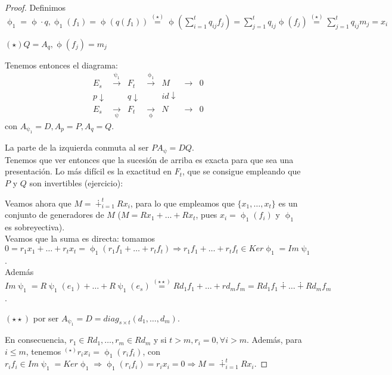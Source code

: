 \documentclass[11pt,a4paper]{article}
\theoremstyle{break}
\begin{document}
\begin{proof}
Definimos $\upphi_{1} = \upphi \cdot q, \upphi_{1}(f_{1}) = \upphi(q(f_{1})) \overset{(\star)}{=} \upphi(\sum_{i=1}^{t} q_{ij}f_{j}) = \sum_{j=1}^{t} q_{ij} \upphi(f_{j}) \overset{(\star)}{=} \sum_{j=1}^{t} q_{ij}m_{j} = x_{i}$

$(\star) Q = A_{q}, \upphi(f_{j}) = m_{j}$

Tenemos entonces el diagrama:
$$\begin{aligned}
E_{s} & \overset{\uppsi_{1}}{\to} & F_{t} & \overset{\upphi_{1}}{\to} & M & \to & 0 \\
p \downarrow & & q \downarrow & & id \downarrow & & & & \\
E_{s} & \underset{\uppsi}{\to} & F_{t} & \underset{\upphi}{\to} & N & \to & 0
\end{aligned}$$
con $A_{\uppsi_{1}} = D, A_{p} = P, A_{q} = Q$.

La parte de la izquierda conmuta al ser $PA_{\uppsi} = DQ$. \\
Tenemos que ver entonces que la sucesión de arriba es exacta para que sea una presentación. Lo más difícil es la exactitud en $F_{t}$, que se consigue empleando que $P$ y $Q$ son invertibles (ejercicio):

Veamos ahora que $M = \dotplus_{i=1}^{t} Rx_{i}$, para lo que empleamos que $\{x_{1}, \dots, x_{t}\}$ es un conjunto de generadores de $M$ ($M = Rx_{1} + \dots + Rx_{t}$, pues $x_{i} = \upphi_{1}(f_{i})$ y $\upphi_{1}$ es sobreyectiva). \\
Veamos que la suma es directa: tomamos $0 = r_{1}x_{1} + \dots + r_{t}x_{t} = \upphi_{1}(r_{1}f_{1} + \dots + r_{t}f_{t}) \Rightarrow r_{1}f_{1} + \dots + r_{t}f_{t} \in Ker \upphi_{1} = Im \uppsi_{1}$. \\
Además $Im \uppsi_{1} = R \uppsi_{1}(e_{1}) + \dots + R \uppsi_{1}(e_{s}) \overset{(\star\star)}{=} Rd_{1}f_{1} + \dots + rd_{m}f_{m} = Rd_{1}f_{1} \dotplus \dots \dotplus Rd_{m}f_{m}$.

$(\star\star)$ por ser $A_{\uppsi_{1}} = D = diag_{s \times t}(d_{1}, \dots, d_{m})$.

En consecuencia, $r_{1} \in Rd_{1}, \dots, r_{m} \in Rd_{m}$ y si $t > m, r_{i} = 0, \forall i > m$. Además, para $i \leq m$, tenemos $^{(\star)} r_{i}x_{i} = \upphi_{1}(r_{i}f_{i})$, con $r_{i}f_{i} \in Im \uppsi_{1} = Ker \upphi_{1} \Rightarrow \upphi_{1}(r_{i}f_{i}) = r_{i}x_{i} = 0 \Rightarrow M = \dotplus_{i=1}^{t} Rx_{i}$.


\end{proof}
\end{document}
